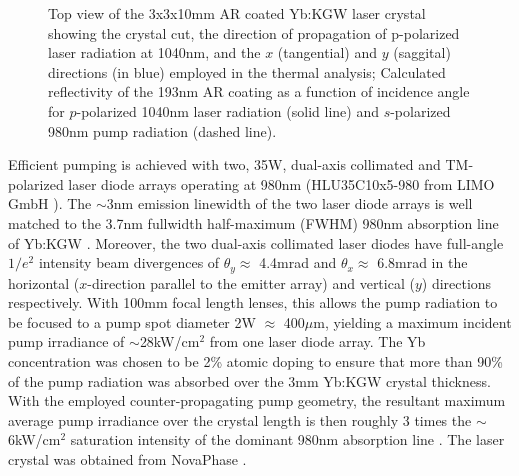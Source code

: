 \begin{figure}
  \subfloat[][]{
    \label{fig:crystal_geo}
    
  }
  \caption{
    \protect{} Top view of the 3x3x10mm AR coated Yb:KGW laser crystal showing the crystal cut, the direction of propagation of p-polarized laser radiation at 1040nm, and the $x$ (tangential) and $y$ (saggital) directions (in blue) employed in the thermal analysis;
    \protect{} Calculated reflectivity of the 193nm  AR coating as a function of incidence angle for $p$-polarized 1040nm laser radiation (solid line) and $s$-polarized 980nm pump radiation (dashed line).
  }
  \label{fig:crystal}
\end{figure}

Efficient pumping is achieved with two, 35W, dual-axis collimated and TM-polarized laser diode arrays operating at 980nm (HLU35C10x5-980 from LIMO GmbH \cite{website_limo}).
The $\sim$3nm emission linewidth of the two laser diode arrays is well matched to the 3.7nm fullwidth half-maximum (FWHM) 980nm absorption line of Yb:KGW \cite{Paunescu_diode_2004,Biswal_thermo_optical_05,website_EKSPLA}.
Moreover, the two dual-axis collimated laser diodes have full-angle $1/e^2$ intensity beam divergences of $\theta_y \approx$ 4.4mrad and $\theta_x \approx$ 6.8mrad in the horizontal ($x$-direction parallel to the emitter array) and vertical ($y$) directions respectively. 
With 100mm focal length lenses, this allows the pump radiation to be focused to a pump spot diameter 2W $\approx$ 400$\mu$m, yielding a maximum incident pump irradiance of $\sim$28kW/cm$^2$ from one laser diode array.
The Yb concentration was chosen to be 2\% atomic doping to ensure that more than 90\% of the pump radiation was absorbed over the 3mm Yb:KGW crystal thickness.
With the employed counter-propagating pump geometry, the resultant maximum average pump irradiance over the crystal length is then roughly 3 times the $\sim$6kW/cm$^2$ saturation intensity of the dominant 980nm absorption line \cite{Brunner_powerful_2004}.
The laser crystal was obtained from NovaPhase \cite{website_nova}.

